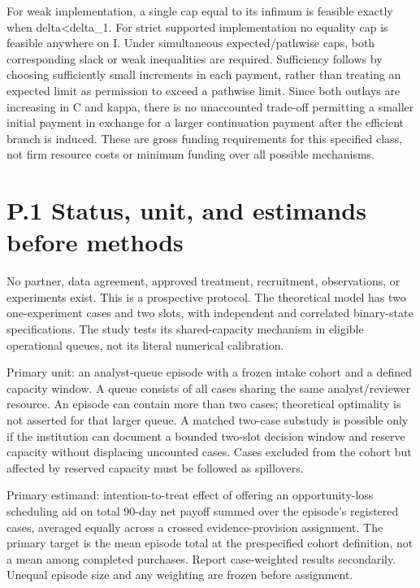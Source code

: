 \documentclass[
  11pt,
]{article}
\begin{document}
For weak implementation, a single cap equal to its infimum is feasible
exactly when delta\textless delta\_1. For strict supported
implementation no equality cap is feasible anywhere on I. Under
simultaneous expected/pathwise caps, both corresponding slack or weak
inequalities are required. Sufficiency follows by choosing sufficiently
small increments in each payment, rather than treating an expected limit
as permission to exceed a pathwise limit. Since both outlays are
increasing in C and kappa, there is no unaccounted trade-off permitting
a smaller initial payment in exchange for a larger continuation payment
after the efficient branch is induced. These are gross funding
requirements for this specified class, not firm resource costs or
minimum funding over all possible mechanisms.

\section{P.1 Status, unit, and estimands before
methods}\label{p.1-status-unit-and-estimands-before-methods}

No partner, data agreement, approved treatment, recruitment,
observations, or experiments exist. This is a prospective protocol. The
theoretical model has two one-experiment cases and two slots, with
independent and correlated binary-state specifications. The study tests
its shared-capacity mechanism in eligible operational queues, not its
literal numerical calibration.

Primary unit: an analyst-queue episode with a frozen intake cohort and a
defined capacity window. A queue consists of all cases sharing the same
analyst/reviewer resource. An episode can contain more than two cases;
theoretical optimality is not asserted for that larger queue. A matched
two-case substudy is possible only if the institution can document a
bounded two-slot decision window and reserve capacity without displacing
uncounted cases. Cases excluded from the cohort but affected by reserved
capacity must be followed as spillovers.

Primary estimand: intention-to-treat effect of offering an
opportunity-loss scheduling aid on total 90-day net payoff summed over
the episode's registered cases, averaged equally across a crossed
evidence-provision assignment. The primary target is the mean episode
total at the prespecified cohort definition, not a mean among completed
purchases. Report case-weighted results secondarily. Unequal episode
size and any weighting are frozen before assignment.
\end{document}
